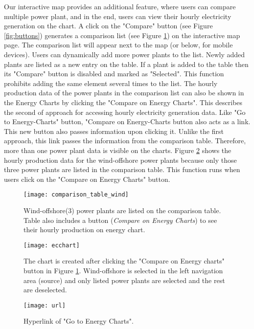Our interactive map provides an additional feature, where users can compare multiple power plant, and in the end, users can view their hourly electricity generation on the chart. A click on the "Compare" button (see Figure \ref{fig:buttons}) generates a comparison list (see Figure \ref{fig:ctable}) on the interactive map page. The comparison list will appear next to the map (or below, for mobile devices). Users can dynamically add more power plants to the list. Newly added plants are listed as a new entry on the table. If a plant is added to the table then its "Compare" button is disabled and marked as "Selected". This function prohibits adding the same element several times to the list. The hourly production data of the power plants in the comparison list can also be shown in the Energy Charts by clicking the "Compare on Energy Charts". This describes the second of approach for accessing hourly electricity generation data. Like "Go to Energy-Charts" button, "Compare on Energy-Charts button also acts as a link. This new button also passes information upon clicking it. Unlike the first approach, this link passes the information from the comparison table. Therefore, more than one power plant data is visible on the charts. Figure \ref{fig:eccharts} shows the hourly production data for the wind-offshore power plants because only those three power plants are listed in the comparison table. This function runs when users click on the "Compare on Energy Charts" button. 

\begin{figure} [H]
\centering
\texttt{[image: comparison\_table\_wind]}
\caption[Wind-offshore(3) power plants are listed on the comparison table]{Wind-offshore(3) power plants are listed on the comparison table. Table also includes a button (\textit{Compare on Energy Charts}) to see their hourly production on energy chart.}
\label{fig:ctable}
\end{figure}

\begin{figure}
\centering
\texttt{[image: ecchart]}
\caption[Energy Chart showing the hourly production data]{The chart is created after clicking the "Compare on Energy charts" button in Figure \ref{fig:ctable}. Wind-offshore is selected in the left navigation area (source) and only listed power plants are selected and the rest are deselected.}
\label{fig:eccharts}
\end{figure}

\begin{figure}
\centering
\texttt{[image: url]}
\caption{Hyperlink of "Go to Energy Charts".}
\label{fig:url}
\end{figure}

